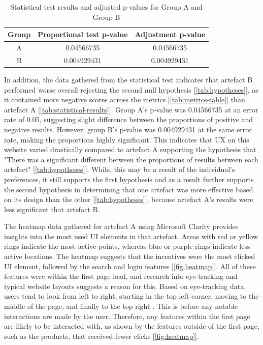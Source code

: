 \documentclass[article]{IEEEtran}
\begin{document}
        \begin{table}[ht]
            \caption{Statistical test results and adjusted p-values for Group A and Group B}
            \centering
            \begin{tabular}{|c|c|c|}
                \hline
                \textbf{Group} & \textbf{Proportional test p-value} & \textbf{Adjustment p-value} \\ \hline
                A & 0.04566735 & 0.04566735 \\ \hline
                B & 0.004929431 & 0.004929431 \\ \hline
            \end{tabular}
            \label{tab:statistical-results}
        \end{table}

        In addition, the data gathered from the statistical test indicates that artefact B performed worse overall rejecting the second null hypothesis [\autoref{tab:hypotheses}], as it contained more negative scores across the metrics [\autoref{tab:metrics-table}] than artefact A [\autoref{tab:statistical-results}]. Group A's p-value was 0.04566735 at an error rate of 0.05, suggesting slight difference between the proportions of positive and negative results. However, group B's p-value was 0.004929431 at the same error rate, making the proportions highly significant. This indicates that UX on this website varied drastically compared to artefact A supporting the hypothesis that "There was a significant different between the proportions of results between each artefact" [\autoref{tab:hypotheses}]. While, this may be a result of the individual's preferences, it still supports the first hypothesis and as a result further supports the second hypothesis in determining that one artefact was more effective based on its design than the other [\autoref{tab:hypotheses}], because artefact A's results were less significant that artefact B.
        
        The heatmap data gathered for artefact A using Microsoft Clarity provides insights into the most used UI elements in that artefact. Areas with red or yellow rings indicate the most active points, whereas blue or purple rings indicate less active locations. The heatmap suggests that the incentives were the most clicked UI element, followed by the search and login features [\autoref{fig:heatmap}]. All of these features were within the first page load, and research into eye-tracking and typical website layouts suggests a reason for this. Based on eye-tracking data, users tend to look from left to right, starting in the top left corner, moving to the middle of the page, and finally to the top right \cite{djamasbi}. This is before any notable interactions are made by the user. Therefore, any features within the first page are likely to be interacted with, as shown by the features outside of the first page, such as the products, that received fewer clicks [\autoref{fig:heatmap}].
\end{document}
